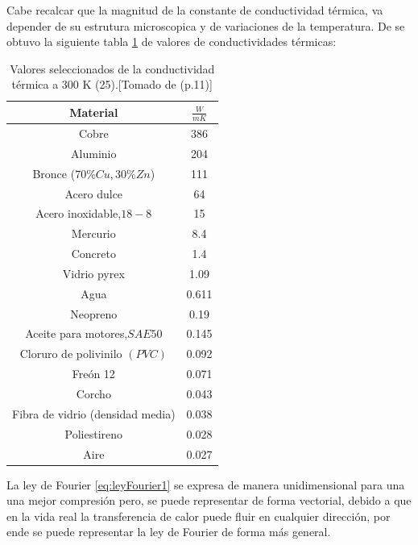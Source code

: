 \documentclass[12pt,letterpaper]{article}     %
\begin{document}
Cabe recalcar que la magnitud de la constante de conductividad térmica, va depender de su estrutura microscopica y de variaciones de la temperatura. De \cite{Warren} se obtuvo la siguiente tabla \ref{Tab:valoresdeconductividad(25C)}  de valores de conductividades térmicas:

\begin{table} [!ht]
\caption{Valores seleccionados de la conductividad térmica a 300 K (25\textcelsius).[Tomado de \cite{Mills}(p.11)]}

\label{Tab:valoresdeconductividad(25C)}
\begin{center}
\begin{tabular}{| c | c | }
\hline

\cline{1-2}
\textbf{Material}& \textbf{$\frac{W}{mK}$} \\
\hline 

Cobre & 386  \\
\hline
Aluminio & 204   \\
\hline
Bronce ($70\% Cu, 30\% Zn $) & 111  \\
\hline
Acero dulce & 64  \\
\hline
Acero inoxidable,$18-8$ & 15  \\
\hline
Mercurio & 8.4  \\
\hline
Concreto & 1.4  \\
\hline
Vidrio pyrex & 1.09  \\
\hline
Agua & 0.611  \\
\hline
Neopreno & 0.19  \\
\hline
Aceite para motores,$SAE 50$ & 0.145  \\
\hline
Cloruro de polivinilo $(PVC)$ & 0.092  \\
\hline
Freón 12 & 0.071  \\
\hline
Corcho & 0.043  \\
\hline
Fibra de vidrio (densidad media) & 0.038  \\
\hline
Poliestireno & 0.028  \\
\hline
Aire & 0.027  \\
\hline

\end{tabular}
\end{center}
\end{table}

La ley de Fourier \ref{eq:leyFourier1} se expresa de manera unidimensional para una una mejor compresión pero, se puede representar de forma vectorial, debido a que en la vida real la transferencia de calor puede fluir en cualquier dirección, por ende se puede representar la ley de Fourier de forma más general.
\end{document}
